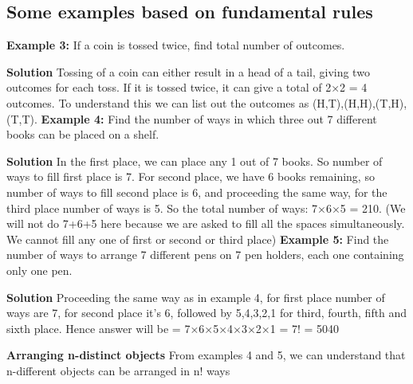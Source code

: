 \documentclass[12pt, a4paper]{article}
\begin{document}
\newpage
\subsection{Some examples based on fundamental rules}
\textbf{Example 3:} If a coin is tossed twice, find total number of outcomes.

\textbf{Solution} Tossing of a coin can either result in a head of a tail, giving two outcomes for each toss. If it is tossed twice, it can give a total of 2×2 = 4 outcomes. To understand this we can list out the outcomes as {(H,T),(H,H),(T,H),(T,T)}.\newline
\textbf{Example 4:} Find the number of ways in which three out 7 different books can be placed on a shelf.

\textbf{Solution} In the first place, we can place any 1 out of 7 books. So number of ways to fill first place is 7. For second place, we have 6 books remaining, so number of ways to fill second place is 6, and proceeding the same way, for the third place number of ways is 5. So the total number of ways: 7×6×5 = 210. (We will not do 7+6+5 here because we are asked to fill all the spaces simultaneously. We cannot fill any one of first or second or third place)\newline
\textbf{Example 5:} Find the number of ways to arrange 7 different pens on 7 pen holders, each one containing only one pen.

\textbf{Solution} Proceeding the same way as in example 4, for first place number of ways are 7, for second place it's 6, followed by 5,4,3,2,1 for third, fourth, fifth and sixth place. Hence answer will be = 7×6×5×4×3×2×1 = 7! = 5040 \newline
\begin{tcolorbox}[colback=TealBlue!10!White,colframe=TealBlue!50!black]
\textbf{Arranging n-distinct objects}
From examples 4 and 5, we can understand that n-different objects can be arranged in n! ways
\end{tcolorbox}
\end{document}
